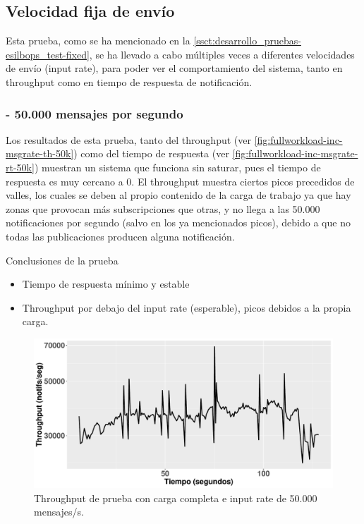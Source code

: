
\subsection*{Velocidad fija de envío}

Esta prueba, como se ha mencionado en la \autoref{ssct:desarrollo_pruebas-esilbops_test-fixed},
se ha llevado a cabo múltiples veces a diferentes velocidades de envío (input rate), para poder
ver el comportamiento del sistema, tanto en throughput como en tiempo de respuesta de notificación.


\subsubsection*{- 50.000 mensajes por segundo}

Los resultados de esta prueba, tanto del throughput (ver 
\autoref{fig:fullworkload-inc-msgrate-th-50k}) como del 
tiempo de respuesta (ver \autoref{fig:fullworkload-inc-msgrate-rt-50k}) 
muestran un sistema que funciona sin saturar, pues el tiempo de respuesta es 
muy cercano a 0. 
El throughput muestra ciertos picos precedidos de valles, los cuales se deben 
al propio contenido de la carga de trabajo ya que hay zonas que provocan más 
subscripciones que otras, y no llega a las 50.000 notificaciones por segundo
(salvo en los ya mencionados picos), debido a que no todas las publicaciones 
producen alguna notificación.

Conclusiones de la prueba
\begin{itemize}
    \item Tiempo de respuesta mínimo y estable
    \item Throughput por debajo del input rate (esperable), picos debidos a la propia carga.
\end{itemize}

\begin{figure}[htpb]
    \centering
    \includegraphics[width=\textwidth]{images/full-worklad-inc-msgrate/th_full-workload-inc-msgrate_50k.pdf}
    \caption{Throughput de prueba con carga completa e input rate de 50.000 mensajes/s.}
    \label{fig:fullworkload-inc-msgrate-th-50k}
\end{figure}

